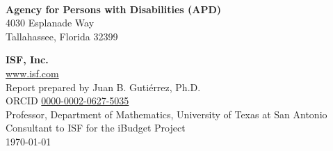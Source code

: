 \begin{flushleft}

\phantom{ghost text}

\vspace{\fill}

\textbf{\VersionMsg}\\
\vspace{1cm}

\noindent \textbf{Agency for Persons with Disabilities (APD)} \\
4030 Esplanade Way \\
Tallahassee, Florida 32399

\vspace{1cm}
\noindent \textbf{ISF, Inc.} \\
\href{https://www.isf.com}{www.isf.com} \\
Report prepared by Juan B. Gutiérrez, Ph.D.\\
ORCID \href{https://orcid.org/0000-0002-0627-5035}{0000-0002-0627-5035} \\
Professor, Department of  Mathematics, University of Texas at San Antonio\\
Consultant to ISF for the iBudget Project\\
\today
\end{flushleft}





\tableofcontents

\newpage


